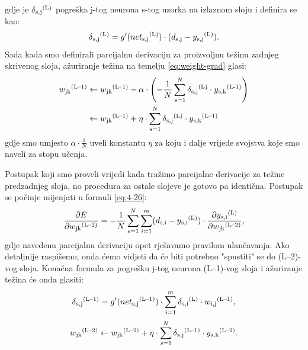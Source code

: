 \documentclass[times, utf8, zavrsni]{fer}
\begin{document}
gdje je $\delta\textsubscript{s,j}\textsuperscript{(L)}$ pogreška j-tog neurona s-tog uzorka na izlaznom sloju i definira se kao:
\begin{equation}
    \label{eq:delta-izlaz}
    \delta\textsubscript{s,j}\textsuperscript{(L)} = g'(net\textsubscript{s,j}\textsuperscript{(L)})\cdot(d\textsubscript{s,j} - y\textsubscript{s,j}\textsuperscript{(L)}).
\end{equation}
Sada kada smo definirali parcijalnu derivaciju za proizvoljnu težinu zadnjeg skrivenog sloja, ažuriranje težina na temelju \eqref{eq:weight-grad} glasi:
\begin{align}
    w\textsubscript{jk}\textsuperscript{(L--1)} &\leftarrow w\textsubscript{jk}\textsuperscript{(L--1)} - \alpha\cdot \left(-\frac{1}{N}\sum\limits_{s=1}^N \delta\textsubscript{s,j}\textsuperscript{(L)} \cdot y\textsubscript{s,k}\textsuperscript{(L-1)}\right) \\
    &\leftarrow w\textsubscript{jk}\textsuperscript{(L--1)} + \eta\cdot\sum\limits_{s=1}^N \delta\textsubscript{s,j}\textsuperscript{(L)} \cdot y\textsubscript{s,k}\textsuperscript{(L--1)}
\end{align}
gdje smo umjesto $\alpha \cdot \frac{1}{N}$ uveli konstantu $\eta$ za koju i dalje vrijede svojstva koje smo naveli za stopu učenja.

\bigskip

Postupak koji smo proveli vrijedi kada tražimo parcijalne derivacije za težine predzadnjeg sloja, no procedura za ostale slojeve je gotovo pa identična. Postupak se počinje mijenjati u formuli \eqref{eq:4-26}:
\begin{equation}
    \frac{\partial E}{\partial w\textsubscript{jk}\textsuperscript{(L--2)}} =
    -\frac{1}{N}\sum\limits_{s=1}^N\sum\limits_{i=1}^m(d\textsubscript{s,i} - y\textsubscript{s,i}\textsuperscript{(L)})\cdot{\frac{\partial y\textsubscript{s,i}\textsuperscript{(L)}}{\partial w\textsubscript{jk}\textsuperscript{(L--2)}}},
\end{equation}
gdje navedenu parcijalnu derivaciju opet rješavamo pravilom ulančavanja. Ako detaljnije raspišemo, onda ćemo vidjeti da će biti potrebno "spustiti" se do (L--2)-vog sloja. Konačna formula za pogrešku j-tog neurona (L--1)-vog sloja i ažuriranje težina će onda glasiti: 
\begin{equation}
    \label{eq:delta-ostali}
    \delta\textsubscript{s,j}\textsuperscript{(L--1)} = g'(net\textsubscript{s,j}\textsuperscript{(L--1)})\cdot\sum\limits_{i=1}^m\delta\textsubscript{s,i}\textsuperscript{(L)}\cdot w\textsubscript{i,j}\textsuperscript{(L--1)},
\end{equation}
\begin{equation}
    w\textsubscript{jk}\textsuperscript{(L--2)} \leftarrow w\textsubscript{jk}\textsuperscript{(L--2)} + \eta\cdot\sum\limits_{s=1}^N \delta\textsubscript{s,j}\textsuperscript{(L--1)} \cdot y\textsubscript{s,k}\textsuperscript{(L--2)}.
\end{equation}
\end{document}
